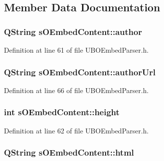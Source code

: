 \subsection{Member Data Documentation}
\hypertarget{structs_o_embed_content_a8253f0b5e913ae5d6e4609461e2bdf5a}{
\subsubsection[{author}]{\setlength{\rightskip}{0pt plus 5cm}Q\-String s\-O\-Embed\-Content\-::author}}\label{d9/d62/structs_o_embed_content_a8253f0b5e913ae5d6e4609461e2bdf5a}


Definition at line 61 of file U\-B\-O\-Embed\-Parser.\-h.

\hypertarget{structs_o_embed_content_a65f2b8e89aff77f4e8f0720b62a911cd}{
\subsubsection[{author\-Url}]{\setlength{\rightskip}{0pt plus 5cm}Q\-String s\-O\-Embed\-Content\-::author\-Url}}\label{d9/d62/structs_o_embed_content_a65f2b8e89aff77f4e8f0720b62a911cd}


Definition at line 66 of file U\-B\-O\-Embed\-Parser.\-h.

\hypertarget{structs_o_embed_content_ae8a962d881e0dc5d2d98b1015bece43e}{
\subsubsection[{height}]{\setlength{\rightskip}{0pt plus 5cm}int s\-O\-Embed\-Content\-::height}}\label{d9/d62/structs_o_embed_content_ae8a962d881e0dc5d2d98b1015bece43e}


Definition at line 62 of file U\-B\-O\-Embed\-Parser.\-h.

\hypertarget{structs_o_embed_content_a454a3bb4bd547e3340e25fedc4b46317}{
\subsubsection[{html}]{\setlength{\rightskip}{0pt plus 5cm}Q\-String s\-O\-Embed\-Content\-::html}}\label{d9/d62/structs_o_embed_content_a454a3bb4bd547e3340e25fedc4b46317}


